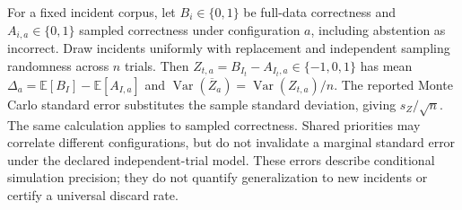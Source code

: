 For a fixed incident corpus, let $B_i\in\{0,1\}$ be full-data correctness and $A_{i,a}\in\{0,1\}$ sampled correctness under configuration $a$, including abstention as incorrect. Draw incidents uniformly with replacement and independent sampling randomness across $n$ trials. Then $Z_{t,a}=B_{I_t}-A_{I_t,a}\in\{-1,0,1\}$ has mean $\Delta_a=\mathbb E[B_I]-\mathbb E[A_{I,a}]$ and $\operatorname{Var}(\overline Z_a)=\operatorname{Var}(Z_{t,a})/n$. The reported Monte Carlo standard error substitutes the sample standard deviation, giving $s_Z/\sqrt n$. The same calculation applies to sampled correctness. Shared priorities may correlate different configurations, but do not invalidate a marginal standard error under the declared independent-trial model. These errors describe conditional simulation precision; they do not quantify generalization to new incidents or certify a universal discard rate.
